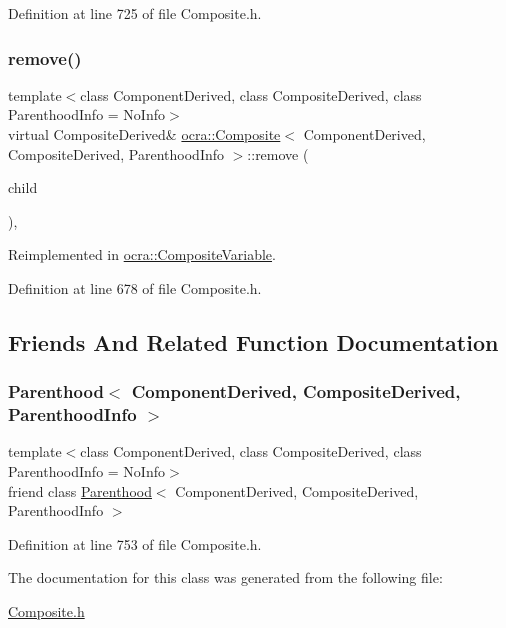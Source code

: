 Definition at line 725 of file Composite.\+h.

\hypertarget{classocra_1_1Composite_a93b8f85ae3267400fdddad9078945e07}{}\label{classocra_1_1Composite_a93b8f85ae3267400fdddad9078945e07} 
\subsubsection{\texorpdfstring{remove()}{remove()}}
{\footnotesize\ttfamily template$<$class Component\+Derived, class Composite\+Derived, class Parenthood\+Info = No\+Info$>$ \\
virtual Composite\+Derived\& \hyperlink{classocra_1_1Composite}{ocra\+::\+Composite}$<$ Component\+Derived, Composite\+Derived, Parenthood\+Info $>$\+::remove (\begin{DoxyParamCaption}\item[{Component\+Derived \&}]{child }\end{DoxyParamCaption})\hspace{0.3cm}{\ttfamily [inline]}, {\ttfamily [virtual]}}



Reimplemented in \hyperlink{classocra_1_1CompositeVariable_ada9e93c4f85c641e2ec8f1152c0b851a}{ocra\+::\+Composite\+Variable}.



Definition at line 678 of file Composite.\+h.



\subsection{Friends And Related Function Documentation}
\hypertarget{classocra_1_1Composite_ad71e675afae5fce6263d2d784cd3907a}{}\label{classocra_1_1Composite_ad71e675afae5fce6263d2d784cd3907a} 
\subsubsection{\texorpdfstring{Parenthood$<$ Component\+Derived, Composite\+Derived, Parenthood\+Info $>$}{Parenthood< ComponentDerived, CompositeDerived, ParenthoodInfo >}}
{\footnotesize\ttfamily template$<$class Component\+Derived, class Composite\+Derived, class Parenthood\+Info = No\+Info$>$ \\
friend class \hyperlink{classocra_1_1Parenthood}{Parenthood}$<$ Component\+Derived, Composite\+Derived, Parenthood\+Info $>$\hspace{0.3cm}{\ttfamily [friend]}}



Definition at line 753 of file Composite.\+h.



The documentation for this class was generated from the following file\+:\begin{DoxyCompactItemize}
\item 
\hyperlink{Composite_8h}{Composite.\+h}\end{DoxyCompactItemize}
